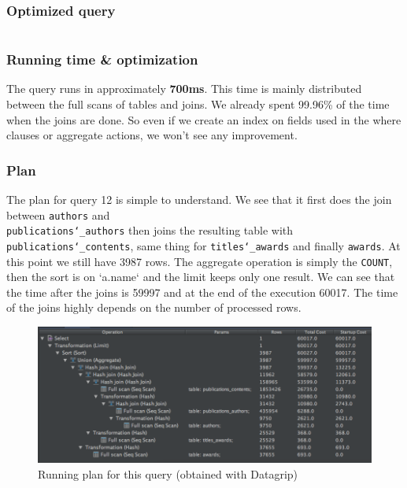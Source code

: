 \documentclass[doubleside, titlepage]{article}
\begin{document}
\subsubsection{Optimized query}
		\begin{lstlisting}[language=SQL,showspaces=false,basicstyle=\ttfamily,numberstyle=\tiny,commentstyle=\color{gray}]

		\end{lstlisting}

\subsubsection{Running time \& optimization}

The query runs in approximately \textbf{700ms}. This time is mainly distributed between the full scans of tables and joins. We already spent 99.96\% of the time when the joins are done. So even if we create an index on fields used in the where clauses or aggregate actions, we won't see any improvement.

\subsubsection{Plan}
The plan for query 12 is simple to understand. We see that it first does the join between \texttt{authors} and ~\\ \texttt{publications\char`_authors} then joins the resulting table with \texttt{publications\char`_contents}, same thing for \texttt{titles\char`_awards} and finally \texttt{awards}. At this point we still have 3987 rows. The aggregate operation is simply the \texttt{COUNT}, then the sort is on `a.name` and the limit keeps only one result.
We can see that the time after the joins is 59997 and at the end of the execution 60017. The time of the joins highly depends on the number of processed rows.

\begin{figure}[!htb]
	\centering
    \includegraphics[scale = 0.5]{./query_analysis/query12}
    \caption{Running plan for this query (obtained with Datagrip)}
\end{figure}
\end{document}

